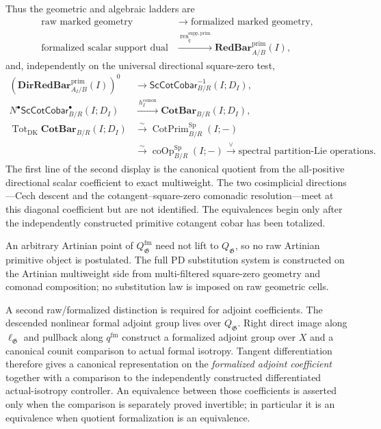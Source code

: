 Thus the geometric and algebraic ladders are
\[
\boxed{
\begin{aligned}
\text{raw marked geometry}
&\longrightarrow
\text{formalized marked geometry},\\
\text{formalized scalar support dual}
&\xrightarrow{\ \operatorname{res}^{\mathrm{supp,prim}}_{\widetilde q}\ }
\mathbf{RedBar}^{\mathrm{prim}}_{A/B}(I),
\end{aligned}}
\]
and, independently on the universal directional square-zero test,
\[
\boxed{
\begin{aligned}
\left(\mathbf{DirRedBar}^{\mathrm{prim}}_{A_I/B}(I)\right)^0
&\longrightarrow
\mathsf{ScCotCobar}^{-1}_{B/R}(I;D_I),\\
N^\bullet\mathsf{ScCotCobar}^{\bullet}_{B/R}(I;D_I)
&\xrightarrow{\ h_I^{\mathrm{comon}}\ }
\mathbf{CotBar}_{B/R}(I;D_I),\\
\operatorname{Tot}_{\mathrm{DK}}\mathbf{CotBar}_{B/R}(I;D_I)
&\xrightarrow{\sim}
\operatorname{CotPrim}^{\mathrm{Sp}}_{B/R}(I;-)\\
&\xrightarrow{\sim}
\operatorname{coOp}^{\mathrm{Sp}}_{B/R}(I;-)
\xrightarrow{\ \vee\ }
\text{spectral partition-Lie operations}.
\end{aligned}}
\]
The first line of the second display is the canonical quotient from the
all-positive directional scalar coefficient to exact multiweight.  The two
cosimplicial directions---Cech descent and the cotangent--square-zero
comonadic resolution---meet at this diagonal coefficient but are not
identified.  The equivalences begin only after the independently constructed
primitive cotangent cobar has been totalized.

An arbitrary Artinian point of $Q_{\mathfrak G}^{\mathrm{fm}}$ need not lift
to $Q_{\mathfrak G}$, so no raw Artinian primitive object is postulated.  The
full PD substitution system is constructed on the Artinian multiweight side
from multi-filtered square-zero geometry and comonad composition; no
substitution law is imposed on raw geometric cells.

A second raw/formalized distinction is required for adjoint coefficients.
The descended nonlinear formal adjoint group lives over
$Q_{\mathfrak G}$.  Right direct image along $\ell_{\mathfrak G}$ and
pullback along $q^{\mathrm{fm}}$ construct a formalized adjoint group over
$X$ and a canonical counit comparison to actual formal isotropy.  Tangent
differentiation therefore gives a canonical representation on the
\emph{formalized adjoint coefficient} together with a comparison to the
independently constructed differentiated actual-isotropy controller.  An
equivalence between those coefficients is asserted only when the comparison
is separately proved invertible; in particular it is an equivalence when
quotient formalization is an equivalence.

